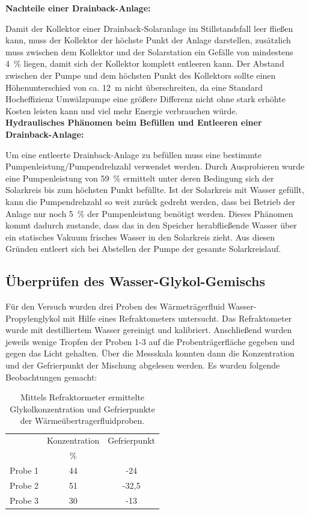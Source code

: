 \textbf{Nachteile einer Drainback-Anlage:}

Damit der Kollektor einer Drainback-Solaranlage im Stillstandsfall leer fließen kann, muss der Kollektor der höchste Punkt der Anlage darstellen, zusätzlich muss zwischen dem Kollektor und der Solarstation ein Gefälle von mindestens \SI{4}{\percent} liegen, damit sich der Kollektor komplett entleeren kann. 
Der Abstand zwischen der Pumpe und dem höchsten Punkt des Kollektors sollte einen Höhenunterschied von ca. \SI{12}{\meter} nicht überschreiten, da eine Standard Hocheffizienz Umwälzpumpe eine größere Differenz nicht ohne stark erhöhte Kosten leisten kann und viel mehr Energie verbrauchen würde. \\

\textbf{Hydraulisches Phänomen beim Befüllen und Entleeren einer Drainback-Anlage:}

Um eine entleerte Drainback-Anlage zu befüllen muss eine bestimmte Pumpenleistung/Pumpendrehzahl verwendet werden. Durch Ausprobieren wurde eine Pumpenleistung von \SI{59}{\percent} ermittelt unter deren Bedingung sich der Solarkreis bis zum höchsten Punkt befüllte. Ist der Solarkreis mit Wasser gefüllt, kann die Pumpendrehzahl so weit zurück gedreht werden, dass bei Betrieb der Anlage nur noch \SI{5}{\percent} der Pumpenleistung benötigt werden. Dieses Phänomen kommt dadurch zustande, dass das in den Speicher herabfließende Wasser über ein statisches Vakuum frisches Wasser in den Solarkreis zieht. Aus diesen Gründen entleert sich bei Abstellen der Pumpe der gesamte Solarkreislauf. 

\subsection{Überprüfen des Wasser-Glykol-Gemischs}

Für den Versuch wurden drei Proben des Wärmeträgerfluid Wasser-Propylenglykol mit Hilfe eines Refraktometers untersucht. Das Refraktometer wurde mit destilliertem Wasser gereinigt und kalibriert. Anschließend wurden jeweils wenige Tropfen der Proben 1-3 auf die Probenträgerfläche gegeben und gegen das Licht gehalten. Über die Messskala konnten dann die Konzentration und der Gefrierpunkt der Mischung abgelesen werden. Es wurden folgende Beobachtungen gemacht:

\begin{table}[H]
	\caption{Mittels Refraktormeter ermittelte Glykolkonzentration und Gefrierpunkte der Wärmeübertragerfluidproben.}
	\centering
	\begin{tabular}{lcc}
		\toprule
		& Konzentration  & Gefrierpunkt \\
		&\si{\percent}& \textcelsius\\
		\midrule
		Probe 1 &       44               &          -24           \\
		Probe 2 &       51            &            -32,5     \\
		Probe 3 &           30           &          -13       \\    
		\bottomrule  
	\end{tabular}
\end{table}

